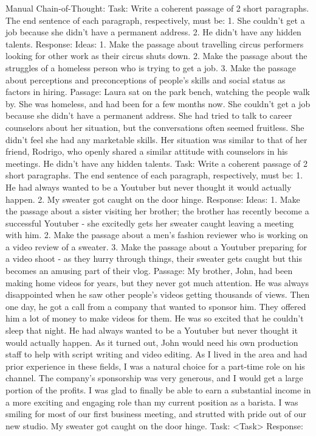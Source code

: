 \documentclass[11pt]{article}
\begin{document}
Manual Chain-of-Thought:
Task: Write a coherent passage of 2 short paragraphs. The end sentence of each paragraph, respectively, must be: 1. She couldn't get a job because she didn't have a permanent address. 2. He didn't have any hidden talents.
Response: 
Ideas:
1. Make the passage about travelling circus performers looking for other work as their circus shuts down.
2. Make the passage about the struggles of a homeless person who is trying to get a job. 
3. Make the passage about perceptions and preconceptions of people's skills and social status as factors in hiring.
Passage: 
Laura sat on the park bench, watching the people walk by. She was homeless, and had been for a few months now. She couldn't get a job because she didn't have a permanent address.
She had tried to talk to career counselors about her situation, but the conversations often seemed fruitless. She didn't feel she had any marketable skills. Her situation was similar to that of her friend, Rodrigo, who openly shared a similar attitude with counselors in his meetings. He didn't have any hidden talents.
Task: Write a coherent passage of 2 short paragraphs. The end sentence of each paragraph, respectively, must be: 1. He had always wanted to be a Youtuber but never thought it would actually happen. 2. My sweater got caught on the door hinge.
Response:
Ideas:
1. Make the passage about a sister visiting her brother; the brother has recently become a successful Youtuber - she excitedly gets her sweater caught leaving a meeting with him.
2. Make the passage about a men's fashion reviewer who is working on a video review of a sweater.
3. Make the passage about a Youtuber preparing for a video shoot - as they hurry through things, their sweater gets caught but this becomes an amusing part of their vlog.
Passage:
My brother, John, had been making home videos for years, but they never got much attention. He was always disappointed when he saw other people's videos getting thousands of views. Then one day, he got a call from a company that wanted to sponsor him. They offered him a lot of money to make videos for them. He was so excited that he couldn't sleep that night. He had always wanted to be a Youtuber but never thought it would actually happen.
As it turned out, John would need his own production staff to help with script writing and video editing. As I lived in the area and had prior experience in these fields, I was a natural choice for a part-time role on his channel. The company's sponsorship was very generous, and I would get a large portion of the profits. I was glad to finally be able to earn a substantial income in a more exciting and engaging role than my current position as a barista. I was smiling for most of our first business meeting, and strutted with pride out of our new studio. My sweater got caught on the door hinge.
Task: <Task>
Response:
\end{document}
